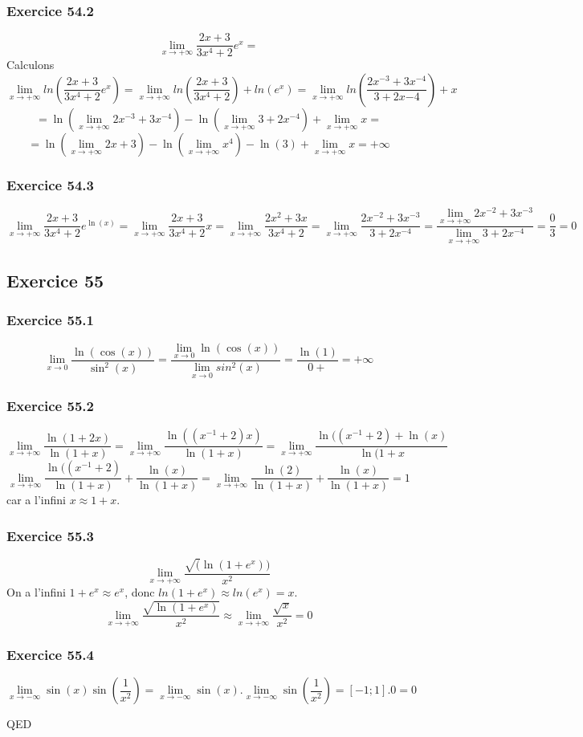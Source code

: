 \documentclass[]{book}
\theoremstyle{definition}
\begin{document}
\subsubsection*{Exercice 54.2}
$$\lim_{x\to+\infty}\frac{2x+3}{3x^4+2}e^x = $$
Calculons 
$$\lim_{x\to+\infty}ln\left(\frac{2x+3}{3x^4+2}e^x\right) = \lim_{x\to+\infty}ln\left(\frac{2x+3}{3x^4+2}\right)+ln(e^x) = \lim_{x\to+\infty}ln\left(\frac{2x^{-3}+3x^{-4}}{3+2x{-4}}\right)+x $$
$$ = \ln(\lim_{x\to+\infty}2x^{-3}+3x^{-4})-\ln(\lim_{x\to+\infty}3+2x^{-4})+ \lim_{x\to+\infty}x = $$
$$ = \ln(\lim_{x\to+\infty}2x+3)-\ln(\lim_{x\to+\infty}x^{4})-\ln(3)+ \lim_{x\to+\infty}x = +\infty$$


\subsubsection*{Exercice 54.3}
$$\lim_{x\to+\infty}\frac{2x+3}{3x^4+2}e^{\ln(x)} = \lim_{x\to+\infty}\frac{2x+3}{3x^4+2}x = \lim_{x\to+\infty}\frac{2x^2+3x}{3x^4+2} = \lim_{x\to+\infty}\frac{2x^{-2}+3x^{-3}}{3+2x^{-4}} = \frac{\lim_{x\to+\infty}2x^{-2}+3x^{-3}}{\lim_{x\to+\infty}3+2x^{-4}} = \frac{0}{3} = 0$$


\subsection*{Exercice 55}
\subsubsection*{Exercice 55.1}
$$\lim_{x\to 0}\frac{\ln(\cos(x))}{\sin^2(x)} = \frac{\lim_{x\to 0}\ln(\cos(x))}{\lim_{x\to 0}sin^2(x)} = \frac{\ln(1)}{0+} = +\infty$$

\subsubsection*{Exercice 55.2}
$$\lim_{x\to+\infty}\frac{\ln(1+2x)}{\ln(1+x)} = \lim_{x\to+\infty}\frac{\ln((x^{-1}+2)x)}{\ln(1+x)} = \lim_{x\to+\infty}\frac{\ln((x^{-1}+2)+\ln(x)}{\ln(1+x}$$
$$\lim_{x\to+\infty}\frac{\ln((x^{-1}+2)}{\ln(1+x)} + \frac{\ln(x)}{\ln(1+x)} = \lim_{x\to+\infty}\frac{\ln(2)}{\ln(1+x)} + \frac{\ln(x)}{\ln(1+x)} = 1$$
car a l'infini $x \approx 1+x$.\\

\subsubsection*{Exercice 55.3}
$$\lim_{x\to+\infty}\frac{\sqrt(\ln(1+e^x))}{x^2}$$
On a l'infini $1+e^x \approx e^x$, donc $ln(1+e^x) \approx ln(e^x) = x$.\\
$$\lim_{x\to+\infty}\frac{\sqrt{\ln(1+e^x)}}{x^2} \approx \lim_{x\to+\infty}\frac{\sqrt{x}}{x^2} = 0$$

\subsubsection*{Exercice 55.4}
$$\lim_{x\to-\infty}\sin(x)\sin(\frac{1}{x^2}) = \lim_{x\to-\infty}\sin(x).\lim_{x\to-\infty}\sin(\frac{1}{x^2}) = [-1;1].0 = 0$$

QED
\end{document}
